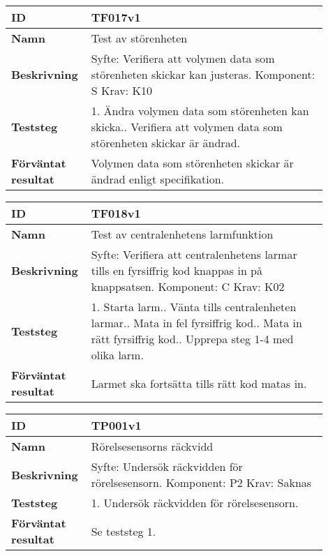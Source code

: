 \begin{table}[h!]
\begin{tabular}{| p{0.18\linewidth} | p{0.72\linewidth} |}
\hline
\textbf{ID} & TF017v1 \\ \hline
\textbf{Namn} & 
Test av störenheten
\\ \hline
\textbf{Beskrivning} &
Syfte: Verifiera att volymen data som störenheten skickar kan justeras.\newline
Komponent: S\newline
Krav: K10
\\ \hline
\textbf{Teststeg} &
1. Ändra volymen data som störenheten kan skicka.\newline
2. Verifiera att volymen data som störenheten skickar är ändrad.
\\ \hline
\textbf{Förväntat resultat} & Volymen data som störenheten skickar är ändrad enligt specifikation.
\\ \hline
\end{tabular}
\end{table}

\newpage
\begin{table}[h!]
\begin{tabular}{| p{0.18\linewidth} | p{0.72\linewidth} |}
\hline
\textbf{ID} & TF018v1 \\ \hline
\textbf{Namn} & 
Test av centralenhetens larmfunktion
\\ \hline
\textbf{Beskrivning} &
Syfte: Verifiera att centralenhetens larmar tills en fyrsiffrig kod knappas in på knappsatsen.\newline
Komponent: C\newline
Krav: K02
\\ \hline
\textbf{Teststeg} &
1. Starta larm.\newline
2. Vänta tills centralenheten larmar.\newline
3. Mata in fel fyrsiffrig kod.\newline
4. Mata in rätt fyrsiffrig kod.\newline
5. Upprepa steg 1-4 med olika larm.
\\ \hline
\textbf{Förväntat resultat} & Larmet ska fortsätta tills rätt kod matas in.
\\ \hline
\end{tabular}
\end{table}

\begin{table}[h!]
\begin{tabular}{| p{0.18\linewidth} | p{0.72\linewidth} |}
\hline
\textbf{ID} & TP001v1 \\ \hline
\textbf{Namn} & 
Rörelsesensorns räckvidd
\\ \hline
\textbf{Beskrivning} &
Syfte: Undersök räckvidden för rörelsesensorn.\newline
Komponent: P2\newline
Krav: Saknas
\\ \hline
\textbf{Teststeg} &
1. Undersök räckvidden för rörelsesensorn.
\\ \hline
\textbf{Förväntat resultat} & Se teststeg 1.
\\ \hline
\end{tabular}
\end{table}

